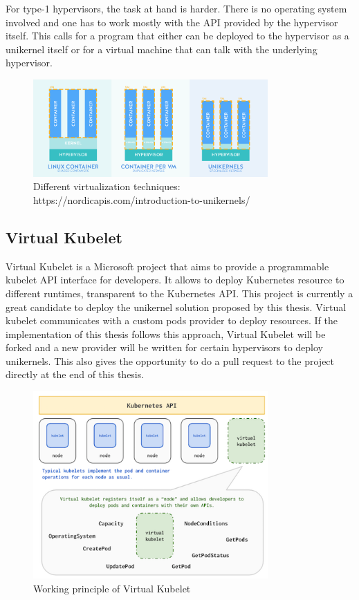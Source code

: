 For type-1 hypervisors, the task at hand is harder. There is no operating system involved and one has to work mostly with the API provided by the hypervisor itself. This calls for a program that either can be deployed to the hypervisor as a unikernel itself or for a virtual machine that can talk with the underlying hypervisor.


\begin{figure}[htpb]
  \centering
  \includegraphics[width=0.8\textwidth]{figures/Linux-containers-vms-unikernels.png}
  \caption{Different virtualization techniques: https://nordicapis.com/introduction-to-unikernels/} \label{fig:virt}
\end{figure}



\subsection{Virtual Kubelet}
Virtual Kubelet\cite{virtual} is a Microsoft project that aims to provide a programmable kubelet API interface for developers. It allows to deploy Kubernetes resource to different runtimes, transparent to the Kubernetes API. This project is currently a great candidate to deploy the unikernel solution proposed by this thesis. Virtual kubelet communicates with a custom pods provider to deploy resources. If the implementation of this thesis follows this approach, Virtual Kubelet will be forked and a new provider will be written for certain hypervisors to deploy unikernels. This also gives the opportunity to do a pull request to the project directly at the end of this thesis.

\begin{figure}[htpb]
  \centering
  \includegraphics[width=0.8\textwidth]{figures/vk.png}
  \caption{Working principle of Virtual Kubelet \cite{virtual}} \label{fig:vk}
\end{figure}

